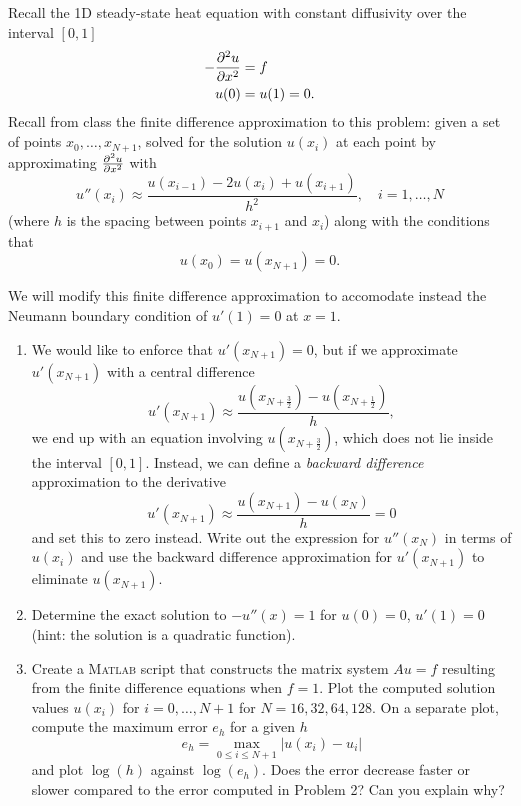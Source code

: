 
Recall the 1D steady-state heat equation with constant diffusivity over the interval $[0,1]$
\begin{align*}
-\frac{\partial^{2} u}{\partial x^{2}} &= f\\
u(0) &= u(1) = 0.
\end{align*}
Recall from class the finite difference approximation to this problem: given a set of points $x_0,\ldots, x_{N+1}$, solved for the solution $u(x_i)$ at each point by approximating $\frac{\partial^{2} u}{\partial x^{2}}$ with
\[
u''({x_i}) \approx \frac{u(x_{i-1}) - 2u(x_i) + u(x_{i+1})}{h^2}, \quad i = 1,\ldots, N
\]
(where $h$ is the spacing between points $x_{i+1}$ and $x_i$) along with the conditions that
\[
u(x_0) = u(x_{N+1}) = 0.
\]

We will modify this finite difference approximation to accomodate instead the Neumann boundary condition of $u'(1) = 0$ at $x=1$.
\begin{enumerate}
\item We would like to enforce that $u'(x_{N+1}) = 0$, but if we approximate $u'(x_{N+1})$ with a central difference
\[
u'(x_{N+1}) \approx \frac{u(x_{N+\frac{3}{2}})-u(x_{N+\frac{1}{2}})}{h},
\]
we end up with an equation involving $u(x_{N+\frac{3}{2}})$, which does not lie inside the interval $[0,1]$. Instead, we can define a \textit{backward difference} approximation to the derivative
\[
u'(x_{N+1}) \approx \frac{u(x_{N+1})-u(x_N)}{h} = 0
\]
and set this to zero instead. Write out the expression for $u''(x_N)$ in terms of $u(x_i)$ and use the backward difference approximation for $u'(x_{N+1})$ to eliminate $u(x_{N+1})$.
\item Determine the exact solution to $-u''(x) = 1$ for $u(0) = 0$, $u'(1) = 0$ (hint: the solution is a quadratic function).
\item Create a \textsc{Matlab} script that constructs the matrix system $Au = f$ resulting from the finite difference equations when $f = 1$.  Plot the computed solution values $u(x_i)$
for $i = 0,\ldots, N+1$ for $N = 16, 32, 64, 128$.   On a separate plot, compute the maximum error $e_h$ for a given $h$
\[
e_{h} = \max_{0 \leq i \leq N+1} | u(x_i) - u_i |
\]
and plot $\log(h)$ against $\log(e_h)$.  Does the error decrease faster or slower compared to the error computed in Problem 2?  Can you explain why?

\end{enumerate}


